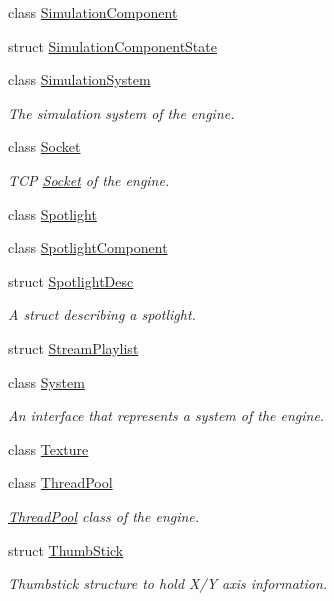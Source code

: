 \begin{DoxyCompactItemize}
class \hyperlink{class_blade_1_1_simulation_component}{Simulation\+Component}
\item 
struct \hyperlink{struct_blade_1_1_simulation_component_state}{Simulation\+Component\+State}
\item 
class \hyperlink{class_blade_1_1_simulation_system}{Simulation\+System}
\begin{DoxyCompactList}\small\item\em The simulation system of the engine. \end{DoxyCompactList}\item 
class \hyperlink{class_blade_1_1_socket}{Socket}
\begin{DoxyCompactList}\small\item\em T\+CP \hyperlink{class_blade_1_1_socket}{Socket} of the engine. \end{DoxyCompactList}\item 
class \hyperlink{class_blade_1_1_spotlight}{Spotlight}
\item 
class \hyperlink{class_blade_1_1_spotlight_component}{Spotlight\+Component}
\item 
struct \hyperlink{struct_blade_1_1_spotlight_desc}{Spotlight\+Desc}
\begin{DoxyCompactList}\small\item\em A struct describing a spotlight. \end{DoxyCompactList}\item 
struct \hyperlink{struct_blade_1_1_stream_playlist}{Stream\+Playlist}
\item 
class \hyperlink{class_blade_1_1_system}{System}
\begin{DoxyCompactList}\small\item\em An interface that represents a system of the engine. \end{DoxyCompactList}\item 
class \hyperlink{class_blade_1_1_texture}{Texture}
\item 
class \hyperlink{class_blade_1_1_thread_pool}{Thread\+Pool}
\begin{DoxyCompactList}\small\item\em \hyperlink{class_blade_1_1_thread_pool}{Thread\+Pool} class of the engine. \end{DoxyCompactList}\item 
struct \hyperlink{struct_blade_1_1_thumb_stick}{Thumb\+Stick}
\begin{DoxyCompactList}\small\item\em Thumbstick structure to hold X/Y axis information. \end{DoxyCompactList}\item 

\end{DoxyCompactItemize}
